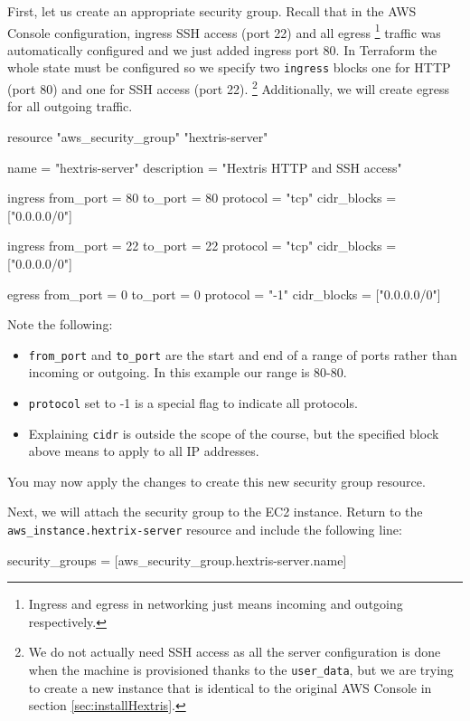 \documentclass{csse4400}
\begin{document}
First, let us create an appropriate security group.
Recall that in the AWS Console configuration,
ingress SSH access (port 22) and all egress%
\footnote{Ingress and egress in networking just means incoming and outgoing respectively.}
traffic was automatically configured and we just added ingress port 80.
In Terraform the whole state must be configured so we specify two
\texttt{ingress} blocks one for HTTP (port 80) and one for SSH access (port 22).%
\footnote{We do not actually need SSH access as all the server configuration is done when the machine is provisioned thanks to the \texttt{user\_data},
but we are trying to create a new instance that is identical to the original AWS Console in section \ref{sec:installHextris}.}
Additionally, we will create egress for all outgoing traffic.

\begin{code}[language=terraform,numbers=none]{}
resource "aws_security_group" "hextris-server" {
  name = "hextris-server"
  description = "Hextris HTTP and SSH access"

  ingress {
    from_port = 80
    to_port = 80
    protocol = "tcp"
    cidr_blocks = ["0.0.0.0/0"]
  }

  ingress {
    from_port = 22
    to_port = 22
    protocol = "tcp"
    cidr_blocks = ["0.0.0.0/0"]
  }

  egress {
    from_port = 0
    to_port = 0
    protocol = "-1"
    cidr_blocks = ["0.0.0.0/0"]
  }
}
\end{code}

Note the following:
\begin{itemize}
  \item \texttt{from\_port} and \texttt{to\_port} are the start and end of a range of ports rather than incoming or outgoing. In this example our range is 80-80.
  \item \texttt{protocol} set to -1 is a special flag to indicate all protocols.
  \item Explaining \texttt{cidr} is outside the scope of the course, but the specified block above means to apply to all IP addresses.
\end{itemize}

You may now apply the changes to create this new security group resource.

Next, we will attach the security group to the EC2 instance.
Return to the \texttt{aws\_instance.hextrix-server} resource
and include the following line:

\begin{code}[language=terraform,numbers=none]{}
security_groups = [aws_security_group.hextris-server.name]
\end{code}
\end{document}
